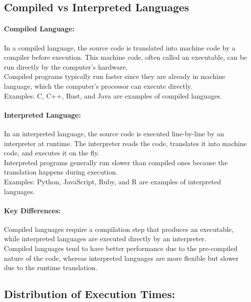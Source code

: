 \documentclass[12pt,halfline,a4paper,]{ouparticle}
\begin{document}
\subsection{Compiled vs Interpreted
Languages}\label{compiled-vs-interpreted-languages}

\paragraph{Compiled Language:}\label{compiled-language}

\hfill\break
In a compiled language, the source code is translated into machine code
by a compiler before execution. This machine code, often called an
executable, can be run directly by the computer's hardware.\\
Compiled programs typically run faster since they are already in machine
language, which the computer's processor can execute directly.\\
Examples: C, C++, Rust, and Java are examples of compiled languages.

\paragraph{Interpreted Language:}\label{interpreted-language}

\hfill\break
In an interpreted language, the source code is executed line-by-line by
an interpreter at runtime. The interpreter reads the code, translates it
into machine code, and executes it on the fly.\\
Interpreted programs generally run slower than compiled ones because the
translation happens during execution.\\
Examples: Python, JavaScript, Ruby, and R are examples of interpreted
languages.

\paragraph{Key Differences:}\label{key-differences}

Compiled languages require a compilation step that produces an
executable, while interpreted languages are executed directly by an
interpreter.\\
Compiled languages tend to have better performance due to the
pre-compiled nature of the code, whereas interpreted languages are more
flexible but slower due to the runtime translation.

\subsection{Distribution of Execution
Times:}\label{distribution-of-execution-times}
\end{document}

